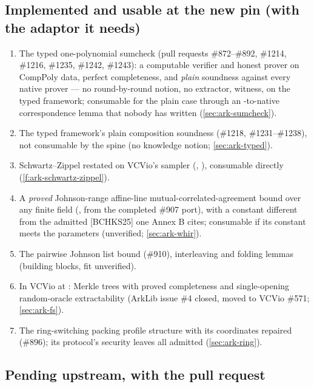 \subsection{Implemented and usable at the new pin (with the adaptor it needs)}\label{sec:ark-list-usable}

\begin{enumerate}[label=(\arabic*)]
\item The typed one-polynomial sumcheck (pull requests \#872--\#892, \#1214, \#1216, \#1235,
  \#1242, \#1243): a computable verifier and honest prover on CompPoly data, perfect
  completeness, and \emph{plain} soundness  against every native prover ---
  no round-by-round notion, no extractor,  witness, on the typed framework; consumable
  for the plain case through an -to-native correspondence lemma that nobody
  has written (\cref{sec:ark-sumcheck}).
\item The typed framework's plain composition soundness (\#1218, \#1231--\#1238), not consumable
  by the spine (no knowledge notion; \cref{sec:ark-typed}).
\item Schwartz--Zippel restated on VCVio's sampler (,
  ), consumable directly (\cref{f:ark-schwartz-zippel}).
\item A \emph{proved} Johnson-range affine-line mutual-correlated-agreement bound over any finite
  field (, from the completed \#907 port), with
  a constant different from the admitted [BCHKS25] one Annex B cites; consumable if its constant
  meets the parameters (unverified; \cref{sec:ark-whir}).
\item The pairwise Johnson list bound (\#910), interleaving and folding lemmas (building blocks,
  fit unverified).
\item In VCVio at : Merkle trees with proved completeness and single-opening
  random-oracle extractability (ArkLib issue \#4 closed, moved to VCVio \#571;
  \cref{sec:ark-fs}).
\item The ring-switching packing profile structure with its coordinates repaired (\#896); its
  protocol's security leaves all admitted (\cref{sec:ark-ring}).
\end{enumerate}

\subsection{Pending upstream, with the pull request}\label{sec:ark-list-pending}

